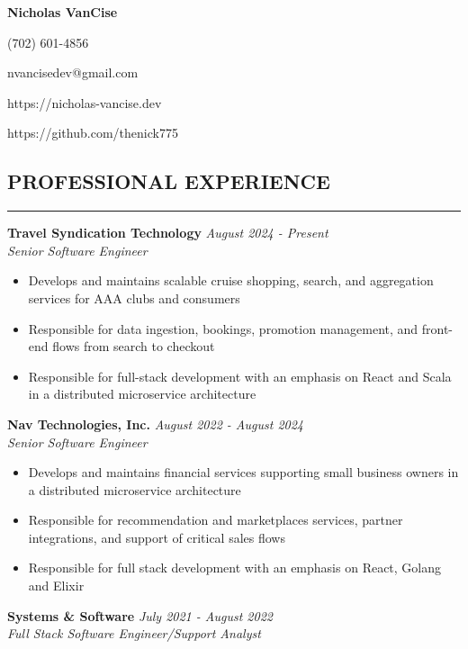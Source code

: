 \documentclass{res}
\begin{document}
	\thispagestyle{empty} %
	\centerline{\bf \Large{Nicholas VanCise}}
	\centerline{(702) 601-4856}
	\centerline{nvancisedev@gmail.com}
    \centerline{https://nicholas-vancise.dev}
    \centerline{https://github.com/thenick775}
    \vspace{-18pt}

	\begin{resume}

		\section{{PROFESSIONAL EXPERIENCE}}
    \noindent\rule[0.5ex]{\linewidth}{1pt}
            {\bf Travel Syndication Technology} \hfill \emph{August 2024 - Present} \\
			\emph{Senior Software Engineer}

            \begin{itemize} \itemsep -2pt
                \item Develops and maintains scalable cruise shopping, search, and aggregation services for AAA clubs and consumers  
                \item Responsible for data ingestion, bookings, promotion management, and front-end flows from search to checkout
                \item Responsible for full-stack development with an emphasis on React and Scala in a distributed microservice architecture
            \end{itemize} \vspace{-2mm}

    		{\bf Nav Technologies, Inc.} \hfill \emph{August 2022 - August 2024} \\
			\emph{Senior Software Engineer}

			\begin{itemize} \itemsep -2pt
				\item Develops and maintains financial services supporting small business owners in a distributed microservice architecture
				\item Responsible for recommendation and marketplaces services, partner integrations, and support of critical sales flows
				\item Responsible for full stack development with an emphasis on React, Golang and Elixir
			\end{itemize} \vspace{-2mm}
    		
    		{\bf Systems \& Software} \hfill \emph{July 2021 - August 2022} \\
			\emph{Full Stack Software Engineer/Support Analyst}


\end{resume}
\end{document}
